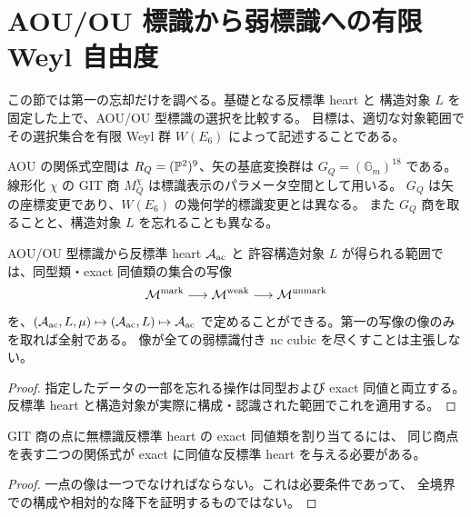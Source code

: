 \section{AOU/OU 標識から弱標識への有限 Weyl 自由度}\label{sec:aou-unmarked}
この節では第一の忘却だけを調べる。基礎となる反標準 heart と
構造対象 $L$ を固定した上で、AOU/OU 型標識の選択を比較する。
目標は、適切な対象範囲でその選択集合を有限 Weyl 群 $W(E_6)$ によって記述することである。

AOU の関係式空間は $R_Q=(\mathbb P^2)^9$、矢の基底変換群は
$G_Q=(\mathbb G_m)^{18}$ である\cite[\S5]{AOU}。
線形化 $\chi$ の GIT 商 $M_Q^\chi$ は標識表示のパラメータ空間として用いる。
$G_Q$ は矢の座標変更であり、$W(E_6)$ の幾何学的標識変更とは異なる。
また $G_Q$ 商を取ることと、構造対象 $L$ を忘れることも異なる。

\begin{proposition}[二段階の忘却の定義域]\label{prop:aou-categorical-map}
AOU/OU 型標識から反標準 heart $\mathcal A_{\rm ac}$ と
許容構造対象 $L$ が得られる範囲では、同型類・exact 同値類の集合の写像
\begin{equation}\label{eq:aou-categorical-map}
 \mathcal M^{\rm mark}\longrightarrow\mathcal M^{\rm weak}
 \longrightarrow\mathcal M^{\rm unmark}
\end{equation}
を、$(\mathcal A_{\rm ac},L,\mu)\mapsto(\mathcal A_{\rm ac},L)\mapsto\mathcal A_{\rm ac}$
で定めることができる。第一の写像の像のみを取れば全射である。
像が全ての弱標識付き nc cubic を尽くすことは主張しない。
\end{proposition}
\begin{proof}
指定したデータの一部を忘れる操作は同型および exact 同値と両立する。
反標準 heart と構造対象が実際に構成・認識された範囲でこれを適用する。
\end{proof}

\begin{proposition}[関係式商点からの写像の必要条件]\label{prop:aou-git-descent-test}
GIT 商の点に無標識反標準 heart の exact 同値類を割り当てるには、
同じ商点を表す二つの関係式が exact に同値な反標準 heart を与える必要がある。
\end{proposition}
\begin{proof}
一点の像は一つでなければならない。これは必要条件であって、
全境界での構成や相対的な降下を証明するものではない。
\end{proof}

